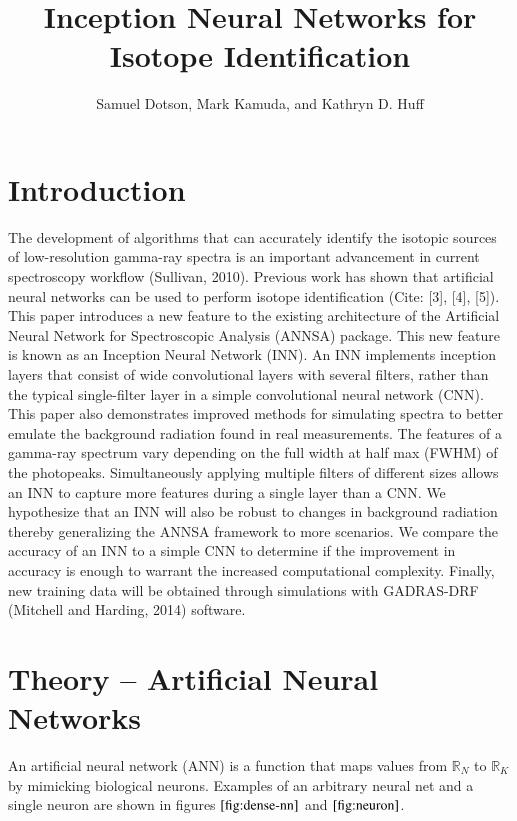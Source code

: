 \documentclass{anstrans}
\title{Inception Neural Networks for Isotope Identification}
\author{Samuel Dotson, Mark Kamuda, and Kathryn D. Huff}
\institute{
Dept. of Nuclear, Plasma and Radiological Engineering, University of Illinois at Urbana-Champaign \\
sgd2@illinois.edu
}
\begin{document}

\section{Introduction}
The development of algorithms that can accurately identify the isotopic sources of low-resolution gamma-ray 
spectra is an important advancement in  current spectroscopy workflow (Sullivan, 2010).
Previous work has shown that artificial neural networks can be used to perform isotope identification (Cite: [3], [4], [5]). This paper introduces a new feature to the existing architecture of the Artificial Neural Network for Spectroscopic Analysis (ANNSA) package. This new feature is known as an Inception Neural Network (INN). An INN implements inception layers that consist of wide convolutional layers with several filters, rather than the typical single-filter layer in a simple convolutional neural network (CNN).
This paper also demonstrates improved methods for simulating spectra to better emulate the background radiation found in real measurements. 
The features of a gamma-ray spectrum vary depending on the full width at half max (FWHM) of the photopeaks. 
Simultaneously applying multiple filters of different sizes allows an INN to capture more features during a single layer than a CNN. 
We hypothesize that an INN will also be robust to changes in background radiation thereby generalizing the ANNSA framework to more scenarios. 
We compare the accuracy of an INN to a simple CNN to determine if the improvement in accuracy is enough to warrant the increased computational complexity. 
Finally, new training data will be obtained through simulations with GADRAS-DRF (Mitchell and Harding, 2014) software.

\section{Theory -- Artificial Neural Networks}

An artificial neural network (ANN) is a function that maps values from ${\mathbb{R}}_{N}$ to ${\mathbb{R}}_{K}$ by mimicking biological 
neurons. Examples of an arbitrary neural net and a single neuron are shown in figures $\ref{fig:dense-nn}$ and $\ref{fig:neuron}$. 
\end{document}
